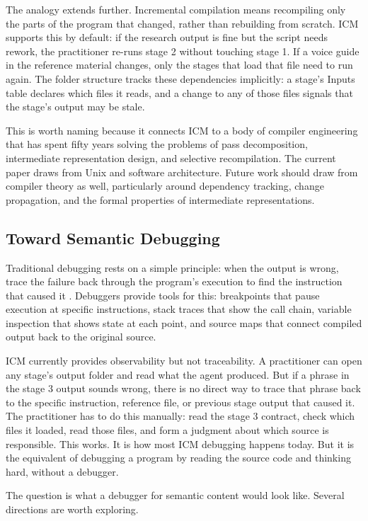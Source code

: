 \documentclass[acmlarge,nonacm,screen]{acmart}
\begin{document}
The analogy extends further. Incremental compilation means recompiling only the parts of the program that changed, rather than rebuilding from scratch. ICM supports this by default: if the research output is fine but the script needs rework, the practitioner re-runs stage 2 without touching stage 1. If a voice guide in the reference material changes, only the stages that load that file need to run again. The folder structure tracks these dependencies implicitly: a stage's Inputs table declares which files it reads, and a change to any of those files signals that the stage's output may be stale.

This is worth naming because it connects ICM to a body of compiler engineering that has spent fifty years solving the problems of pass decomposition, intermediate representation design, and selective recompilation. The current paper draws from Unix and software architecture. Future work should draw from compiler theory as well, particularly around dependency tracking, change propagation, and the formal properties of intermediate representations.

\subsection{Toward Semantic Debugging}

Traditional debugging rests on a simple principle: when the output is wrong, trace the failure back through the program's execution to find the instruction that caused it \cite{zeller2009}. Debuggers provide tools for this: breakpoints that pause execution at specific instructions, stack traces that show the call chain, variable inspection that shows state at each point, and source maps that connect compiled output back to the original source.

ICM currently provides observability but not traceability. A practitioner can open any stage's output folder and read what the agent produced. But if a phrase in the stage 3 output sounds wrong, there is no direct way to trace that phrase back to the specific instruction, reference file, or previous stage output that caused it. The practitioner has to do this manually: read the stage 3 contract, check which files it loaded, read those files, and form a judgment about which source is responsible. This works. It is how most ICM debugging happens today. But it is the equivalent of debugging a program by reading the source code and thinking hard, without a debugger.

The question is what a debugger for semantic content would look like. Several directions are worth exploring.
\end{document}
